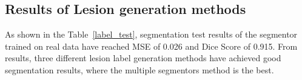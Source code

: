 \documentclass[letterpaper]{article} %
\begin{document}
\subsection{Results of Lesion generation methods}
\begin{table}[t]
	\caption{Lesion generation methods experiments}\smallskip
	\centering
	\label{label_test}	
\end{table}

As shown in the Table~\ref{label_test}, segmentation test results of the segmentor trained on real data have reached MSE of 0.026 and Dice Score of 0.915. From results, three different lesion label generation methods have achieved good segmentation results, where the multiple segmentors method is the best. 
\end{document}

